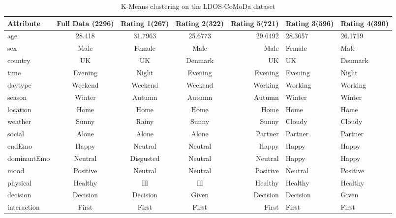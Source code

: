 \documentclass{article}
\begin{document}
\begin{table}[t]
\caption{K-Means clustering on the LDOS-CoMoDa dataset}
\label{kmeans}
\vskip 0.15in
\begin{center}
\begin{small}
\begin{sc}
\begin{tabular}{lcccr}
\hline
\abovespace\belowspace
Attribute & Full Data (2296) & Rating 1(267) & Rating 2(322) & Rating 5(721) & Rating 3(596) &  Rating 4(390) \\
\hline
\abovespace
age         &  28.418  & 31.7963  & 25.6773 & 29.6492  & 28.3657  & 26.1719 \\
sex         &    Male  & Female   & Male    & Male     & Female   & Male    \\
country     &      UK  & UK       & Denmark & UK       & UK       & Denmark \\
time        & Evening  & Night    & Evening & Evening  & Evening  & Night   \\
daytype     & Weekend  & Weekend  & Weekend & Working  & Working  & Working \\
season      &  Winter  & Autumn   & Autumn  & Autumn   & Winter   & Winter  \\
location    &    Home  & Home     & Home    & Home     & Home     & Home       \\
weather     &   Sunny  & Rainy    & Sunny   & Sunny    & Cloudy   & Cloudy     \\
social      &   Alone  & Alone    & Alone   & Partner  & Partner   & Partner    \\
endEmo      &   Happy  & Neutral  & Neutral & Happy    & Happy  & Happy    \\
dominantEmo & Neutral  & Disgusted & Neutral & Neutral & Happy    & Happy    \\
mood        & Positive & Neutral  & Neutral & Positive & Neutral  & Positive   \\
physical    & Healthy  & Ill  & Ill & Healthy  & Healthy  & Healthy    \\
decision    & Decision & Decision & Given   & Decision & Decision & Given      \\
\belowspace
interaction & First    & First    & First   & First    & First    & First      \\
\hline
\end{tabular}
\end{sc}
\end{small}
\end{center}
\vskip -0.1in
\end{table}
\end{document}
